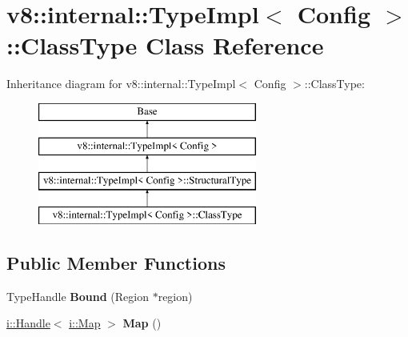 \hypertarget{classv8_1_1internal_1_1_type_impl_1_1_class_type}{}\section{v8\+:\+:internal\+:\+:Type\+Impl$<$ Config $>$\+:\+:Class\+Type Class Reference}
\label{classv8_1_1internal_1_1_type_impl_1_1_class_type}
Inheritance diagram for v8\+:\+:internal\+:\+:Type\+Impl$<$ Config $>$\+:\+:Class\+Type\+:\begin{figure}[H]
\begin{center}
\leavevmode
\includegraphics[height=4.000000cm]{classv8_1_1internal_1_1_type_impl_1_1_class_type}
\end{center}
\end{figure}
\subsection*{Public Member Functions}
\begin{DoxyCompactItemize}
\item 
\hypertarget{classv8_1_1internal_1_1_type_impl_1_1_class_type_a78c416da550df2be762bf345fd998965}{}Type\+Handle {\bfseries Bound} (Region $\ast$region)\label{classv8_1_1internal_1_1_type_impl_1_1_class_type_a78c416da550df2be762bf345fd998965}

\item 
\hypertarget{classv8_1_1internal_1_1_type_impl_1_1_class_type_a0b79b217661205fe948e819d04b8d2d7}{}\hyperlink{classv8_1_1internal_1_1_handle}{i\+::\+Handle}$<$ \hyperlink{classv8_1_1internal_1_1_map}{i\+::\+Map} $>$ {\bfseries Map} ()\label{classv8_1_1internal_1_1_type_impl_1_1_class_type_a0b79b217661205fe948e819d04b8d2d7}

\end{DoxyCompactItemize}
